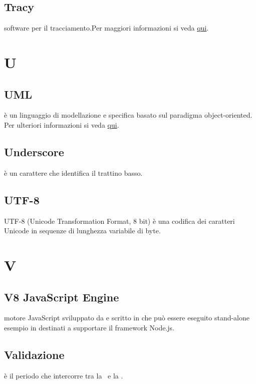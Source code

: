\documentclass[12pt,a4paper]{article}
\begin{document}
\subsection{Tracy} 
software  per il tracciamento.Per maggiori informazioni si veda \href{http://tracy-tpiga.rhcloud.com/tracy/}{qui}.


\newpage

\section{U}


\subsection{UML} 
è un linguaggio di modellazione e specifica basato sul paradigma object-oriented. Per ulteriori informazioni si veda \href{http://it.wikipedia.org/wiki/Unified_Modeling_Language}{qui}.

\subsection{Underscore} 
è un carattere che identifica il trattino basso.

\subsection{UTF-8}
UTF-8 (Unicode Transformation Format, 8 bit) è una codifica dei caratteri Unicode in sequenze di lunghezza variabile di byte.

\newpage

\section{V}


\subsection{V8 JavaScript Engine} 
motore JavaScript  sviluppato da  e scritto in  che  può essere eseguito stand-alone esempio in  destinati a supportare il framework Node.js.

\subsection{Validazione} 
è il periodo che intercorre tra la \RQ\ e la \RA.
\end{document}
